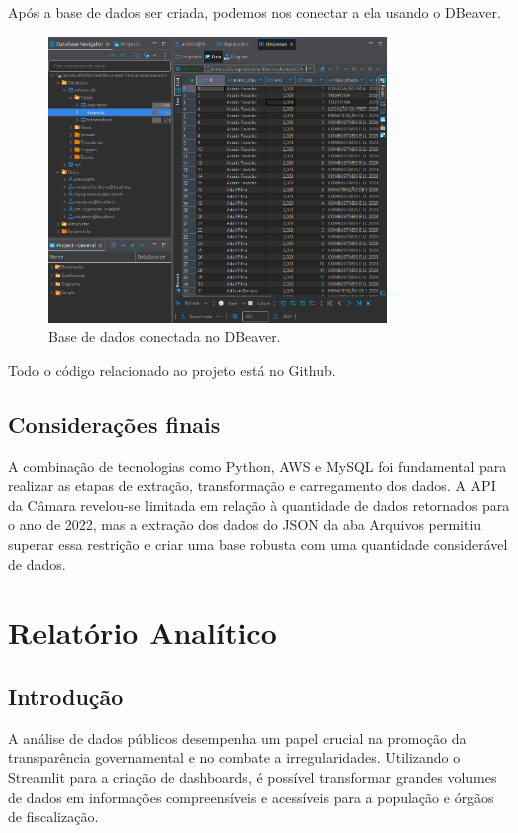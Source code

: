 \documentclass[12pt, a4paper]{article}
\begin{document}
Após a base de dados ser criada, podemos nos conectar a ela usando o DBeaver\cite{dbeaver}.

\begin{figure}[!htbp]
    \centering
    \includegraphics[width=0.8\textwidth]{assets/1_dbeaver.png}
    \caption{Base de dados conectada no DBeaver.}
    \label{fig:db conexão}
\end{figure}

Todo o código relacionado ao projeto está no Github\cite{github_repo}.

\subsection{Considerações finais}

A combinação de tecnologias como Python, AWS e MySQL foi fundamental para realizar as etapas de extração, transformação e carregamento dos dados. A API da Câmara revelou-se limitada em relação à quantidade de dados retornados para o ano de 2022, mas a extração dos dados do JSON da aba Arquivos permitiu superar essa restrição e criar uma base robusta com uma quantidade considerável de dados.

\section{Relatório Analítico}

\subsection{Introdução}

A análise de dados públicos desempenha um papel crucial na promoção da transparência governamental e no combate a irregularidades. Utilizando o Streamlit para a criação de dashboards, é possível transformar grandes volumes de dados em informações compreensíveis e acessíveis para a população e órgãos de fiscalização.
\end{document}
